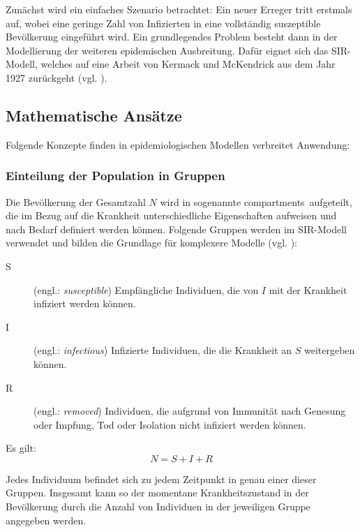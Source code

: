 \documentclass[../main.tex]{subfiles}
\begin{document}
    Zunächst wird ein einfaches Szenario betrachtet: Ein neuer Erreger tritt erstmals auf, wobei eine geringe Zahl von Infizierten in eine vollständig suszeptible Bevölkerung eingeführt wird.
    Ein grundlegendes Problem besteht dann in der Modellierung der weiteren epidemischen Ausbreitung.
    Dafür eignet sich das SIR-Modell, welches auf eine Arbeit von Kermack und McKendrick aus dem Jahr 1927 zurückgeht (vgl. \cite[S. 90]{Bri03}).

    \subsection{Mathematische Ansätze}
    \label{ssec:mathematical_approach}
    Folgende Konzepte finden in epidemiologischen Modellen verbreitet Anwendung:
        \subsubsection{Einteilung der Population in Gruppen}
        \label{sssec:compartments}
        Die Bevölkerung der Gesamtzahl $N$ wird in sogenannte \glqq compartments\grqq\  aufgeteilt, die im Bezug auf die Krankheit unterschiedliche Eigenschaften aufweisen und nach  Bedarf definiert werden können. Folgende Gruppen werden im SIR-Modell verwendet und bilden die Grundlage für komplexere Modelle (vgl. \cite[S. 2]{Sul12}):

        \begin{description}
            \item[S] (engl.: \textit{susceptible}) Empfängliche Individuen, die von $I$ mit der Krankheit infiziert werden können.
            \item[I] (engl.: \textit{infectious}) Infizierte Individuen, die die Krankheit an $S$ weitergeben können.
            \item[R] (engl.: \textit{removed}) Individuen, die aufgrund von Immunität nach Genesung oder Impfung, Tod oder Isolation nicht infiziert werden können.
        \end{description}
        Es gilt:
        \begin{equation}
            \label{eq:constant_population}
            N = S + I + R
        \end{equation}

        Jedes Individuum befindet sich zu jedem Zeitpunkt in genau einer dieser Gruppen. Insgesamt kann so der momentane Krankheitszustand in der Bevölkerung durch die Anzahl von Individuen in der jeweiligen Gruppe angegeben werden.
\end{document}
